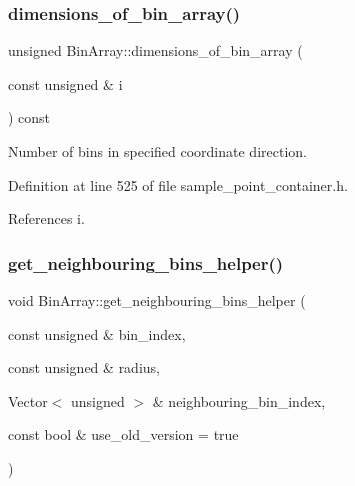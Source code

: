 \mbox{\label{classBinArray_a7814241e3fa3da0f5449a85a6d0d2ee1}} 
\subsubsection{\texorpdfstring{dimensions\+\_\+of\+\_\+bin\+\_\+array()}{dimensions\_of\_bin\_array()}\hspace{0.1cm}{\footnotesize\ttfamily [2/2]}}
{\footnotesize\ttfamily unsigned Bin\+Array\+::dimensions\+\_\+of\+\_\+bin\+\_\+array (\begin{DoxyParamCaption}\item[{const unsigned \&}]{i }\end{DoxyParamCaption}) const\hspace{0.3cm}{\ttfamily [inline]}}



Number of bins in specified coordinate direction. 



Definition at line 525 of file sample\+\_\+point\+\_\+container.\+h.



References i.

\mbox{\label{classBinArray_a704060ec54de24dd65c73af63a25d2b2}} 
\subsubsection{\texorpdfstring{get\+\_\+neighbouring\+\_\+bins\+\_\+helper()}{get\_neighbouring\_bins\_helper()}}
{\footnotesize\ttfamily void Bin\+Array\+::get\+\_\+neighbouring\+\_\+bins\+\_\+helper (\begin{DoxyParamCaption}\item[{const unsigned \&}]{bin\+\_\+index,  }\item[{const unsigned \&}]{radius,  }\item[{Vector$<$ unsigned $>$ \&}]{neighbouring\+\_\+bin\+\_\+index,  }\item[{const bool \&}]{use\+\_\+old\+\_\+version = {\ttfamily true} }\end{DoxyParamCaption})}



